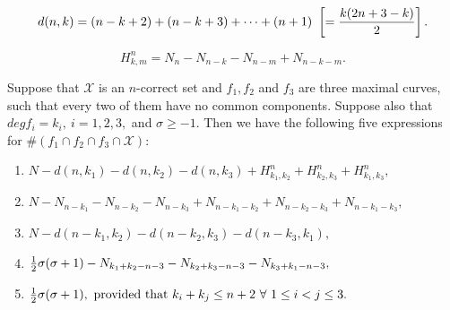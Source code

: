 \documentclass[10pt,a4paper]{amsart}
\newcommand{\Xset}{\mathcal{X}}
\begin{document}
\begin{equation}\label{dnk2}d(n, k) = (n-k+2)+(n-k+3)+\cdots+(n+1)\ \left[={k(2n+3-k)\over 2}\right].\end{equation}

\begin{equation}\label{zsss2} H_{k,m}^n = N_n-N_{n-k}-N_{n-m}+N_{n-k-m}. 
\end{equation}

\begin{proposition} \label{prop1011}
Suppose that $\Xset$ is an $n$-correct set and $f_1, f_2$ and $f_3$ are
three maximal curves, such that every two of them have no common components. Suppose also that $deg f_i=k_i, \ i=1,2,3,$ and $\sigma\ge -1.$
Then we have the following five expressions for $\#(f_1\cap f_2\cap f_3 \cap \Xset):$
\begin{enumerate}
\item
$N-d(n,k_1)-d(n,k_2)-d(n,k_3)+H_{k_1,k_2}^n+H_{k_2,k_3}^n+H_{k_1,k_3}^n,$
\item
$N-N_{n-k_1}-N_{n-k_2}-N_{n-k_3}+N_{n-k_1-k_2}+N_{n-k_2-k_3}+N_{n-k_1-k_3},$
\item
$N-d(n-k_1, k_2)-d(n-k_2,k_3)-d(n-k_3,k_1),$
\item
${1\over 2} \sigma(\sigma+1)-N_{k_1+k_2-n-3}-N_{k_2+k_3-n-3}-N_{k_3+k_1-n-3},$
\item
${1\over 2} \sigma(\sigma+1),\ \hbox{provided that}\  k_i+k_j\le n+2\ \forall\ 1\le i<j\le 3.$ 
\end{enumerate}

\end{proposition}
\end{document}
